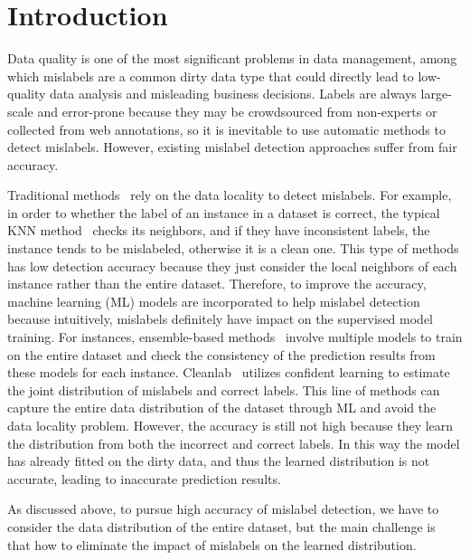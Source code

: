 \section{Introduction} 
\label{sec:intro}
Data quality is one of the most significant problems in data management, among which mislabels are a common dirty data type that could directly lead to  low-quality data analysis  and misleading business decisions. Labels are always large-scale and error-prone because they may be crowdsourced from non-experts or collected from web annotations, so it is inevitable to use automatic methods to detect mislabels. However, existing mislabel detection approaches suffer from fair accuracy.


 Traditional methods~\cite{} rely on the data locality to detect mislabels. For example, in order to whether the label of an instance in a dataset is correct, the typical KNN method~\cite{} checks its neighbors, and if they have inconsistent labels, the instance tends to be mislabeled, otherwise it is a clean one. This type of methods has low detection accuracy because they just consider the local neighbors of each instance rather than the entire dataset. Therefore, to improve the accuracy, machine learning (ML) models are incorporated to help mislabel detection~\cite{} because intuitively,  mislabels definitely have impact on the supervised model training. For instances, ensemble-based methods~\cite{} involve multiple models to train on the entire dataset and check the consistency of the prediction results from these models for each instance. Cleanlab~\cite{} utilizes confident learning to estimate the joint distribution of mislabels and correct labels. This line of methods can capture the entire data distribution of the dataset through ML and avoid the data locality problem. However, the accuracy is still not high because they learn the distribution from both the incorrect and correct labels. In this way the model has already fitted on the dirty data, and thus the learned distribution is not accurate, leading to inaccurate prediction results.


 As discussed above, to pursue high accuracy of mislabel detection, we have to consider the data distribution of the entire dataset, but the main challenge is that how to eliminate the impact of mislabels on the learned distribution.



